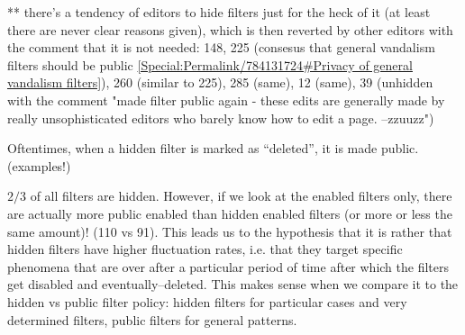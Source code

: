   ** there's a tendency of editors to hide filters just for the heck of it (at least there are never clear reasons given), which is then reverted by other editors with the comment that it is not needed: 148, 225 (consesus that general vandalism filters should be public \url{[Special:Permalink/784131724#Privacy of general vandalism filters]}), 260 (similar to 225), 285 (same), 12 (same), 39 (unhidden with the comment "made filter public again - these edits are generally made by really unsophisticated editors who barely know how to edit a page. --zzuuzz")

Oftentimes, when a hidden filter is marked as ``deleted'', it is made public. (examples!)

$2/3$ of all filters are hidden.
However, if we look at the enabled filters only, there are actually more public enabled than hidden enabled filters (or more or less the same amount)! (110 vs 91).
This leads us to the hypothesis that it is rather that hidden filters have higher fluctuation rates, i.e. that they target specific phenomena that are over after a particular period of time after which the filters get disabled and eventually–deleted.
This makes sense when we compare it to the hidden vs public filter policy: hidden filters for particular cases and very determined filters, public filters for general patterns.

